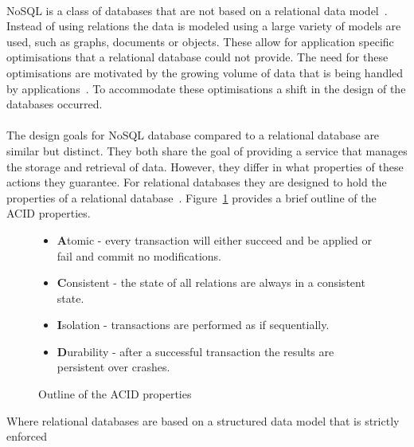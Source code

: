 \documentclass{CRPITStyle}
\renewcommand{\cite}{\citep}
\begin{document}
\paragraph{}
NoSQL is a class of databases that are not based on
a relational data model~\cite{nosql_db}.
Instead of using relations the data is modeled using a large
variety of models are used, such as graphs, documents or objects.
These allow for application specific optimisations that
a relational database could not provide.
The need for these optimisations are motivated by the growing
volume of data that is being handled by applications~\cite{nosql_db}.
To accommodate these optimisations a shift in the design of the
databases occurred.

\paragraph{}
The design goals for NoSQL database compared to
a relational database are similar but distinct.
They both share the goal of providing a service that
manages the storage and retrieval of data.
However, they differ in what properties
of these actions they guarantee.
For relational databases they are designed to hold
the properties of a relational database~\cite{relational_db,base}.
Figure~\ref{l:acid} provides a brief outline of the ACID properties.

\begin{figure}
\begin{itemize}
    \item \textbf{A}tomic - every transaction will either
        succeed and be applied or fail and commit no modifications.
    \item \textbf{C}onsistent - the state of all relations are
        always in a consistent state.
    \item \textbf{I}solation - transactions are performed as if sequentially.
    \item \textbf{D}urability - after a successful transaction the results
        are persistent over crashes.
\end{itemize}
    \caption{Outline of the ACID properties \cite{relational_db,base}}
    \label{l:acid}
\end{figure}



Where relational databases are based on a structured
data model that is strictly enforced~\cite{relational_db}

\end{document}
